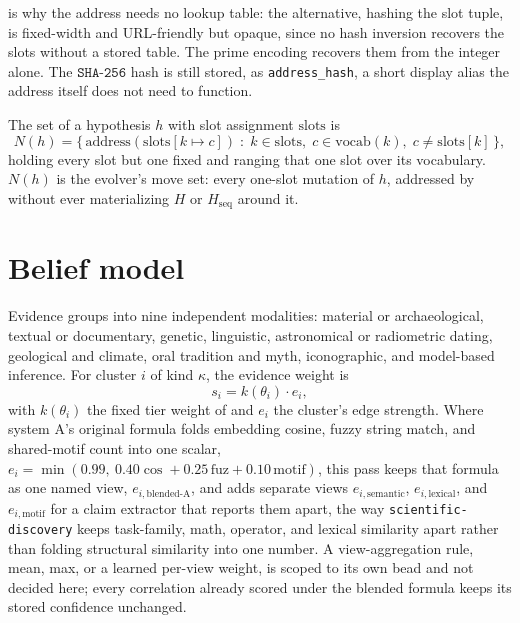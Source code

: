 \documentclass[11pt]{article}
\begin{document}
 is why the address needs no lookup table: the
alternative, hashing the slot tuple, is fixed-width and URL-friendly but
opaque, since no hash inversion recovers the slots without a stored
table. The prime encoding recovers them from the integer alone. The
$\mathtt{SHA\text{-}256}$ hash is still stored, as \texttt{address\_hash},
a short display alias the address itself does not need to function.

\begin{definition}
\label{def:neighbors}
The  set of a hypothesis $h$ with slot
assignment $\mathrm{slots}$ is
\begin{equation}
  \label{eq:neighbors}
  N(h) = \bigl\{\, \mathrm{address}(\mathrm{slots}[k \mapsto c]) \;:\;
    k \in \mathrm{slots}, \; c \in \mathrm{vocab}(k), \; c \neq
    \mathrm{slots}[k] \,\bigr\},
\end{equation}
holding every slot but one fixed and ranging that one slot over its
vocabulary. $N(h)$ is the evolver's move set: every one-slot mutation of
$h$, addressed by  without ever materializing $H$ or
$H_{\mathrm{seq}}$ around it.
\end{definition}

\section{Belief model}
\label{sec:belief}

Evidence groups into nine independent modalities: material or
archaeological, textual or documentary, genetic, linguistic, astronomical
or radiometric dating, geological and climate, oral tradition and myth,
iconographic, and model-based inference. For cluster $i$ of kind
$\kappa$, the evidence weight is
\begin{equation}
  \label{eq:cluster-weight}
  s_i = k(\theta_i) \cdot e_i,
\end{equation}
with $k(\theta_i)$ the fixed tier weight of  and $e_i$
the cluster's edge strength. Where system A's original formula folds
embedding cosine, fuzzy string match, and shared-motif count into one
scalar, $e_i = \min(0.99,\ 0.40 \cos + 0.25\, \mathrm{fuz} + 0.10\,
\mathrm{motif})$, this pass keeps that formula as one named view,
$e_{i,\mathrm{blended\text{-}A}}$, and adds separate views
$e_{i,\mathrm{semantic}}$, $e_{i,\mathrm{lexical}}$, and
$e_{i,\mathrm{motif}}$ for a claim extractor that reports them apart, the
way \texttt{scientific-discovery} keeps task-family, math, operator, and
lexical similarity apart rather than folding structural similarity into
one number. A view-aggregation rule, mean, max, or a learned per-view
weight, is scoped to its own bead and not decided here; every
correlation already scored under the blended formula keeps its stored
confidence unchanged.
\end{document}
